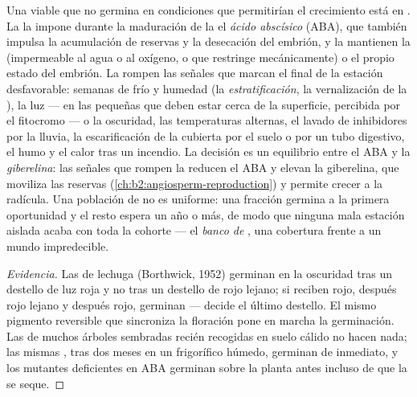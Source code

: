 \begin{definition}\label{def:b2:plant-flowering:dormancy}
Una  viable que no germina en condiciones que permitirían el
crecimiento está en \emph{}. La  la impone durante la
maduración de la  el \emph{ácido abscísico} (ABA), que también
impulsa la acumulación de reservas y la desecación del embrión, y la
mantienen la  (impermeable al agua o al oxígeno, o que
restringe mecánicamente) o el propio estado del embrión. La rompen las
señales que marcan el final de la estación desfavorable: semanas de frío
y humedad (la \emph{estratificación}, la vernalización de la ), la
luz --- en las  pequeñas que deben estar cerca de la superficie,
percibida por el fitocromo --- o la oscuridad, las temperaturas
alternas, el lavado de inhibidores por la lluvia, la escarificación de la
cubierta por el suelo o por un tubo digestivo, el humo y el calor tras un
incendio. La decisión es un equilibrio entre el ABA y la
\emph{giberelina}: las señales que rompen la  reducen el ABA y
elevan la giberelina, que moviliza las reservas
(\cref{ch:b2:angiosperm-reproduction}) y permite crecer a la radícula. Una
población de  no es uniforme: una fracción germina a la primera
oportunidad y el resto espera un año o más, de modo que ninguna mala
estación aislada acaba con toda la cohorte --- el \emph{banco de
}, una cobertura frente a un mundo impredecible.
\end{definition}
\begin{proof}[Evidencia]
Las  de lechuga (Borthwick, 1952) germinan en la oscuridad tras un
destello de luz roja y no tras un destello de rojo lejano; si reciben
rojo, después rojo lejano y después rojo, germinan --- decide el último
destello. El mismo pigmento reversible que sincroniza la floración pone
en marcha la germinación. Las  de muchos árboles sembradas recién
recogidas en suelo cálido no hacen nada; las mismas , tras dos
meses en un frigorífico húmedo, germinan de inmediato, y los mutantes
deficientes en ABA germinan sobre la planta antes incluso de que la
 se seque.
\end{proof}

